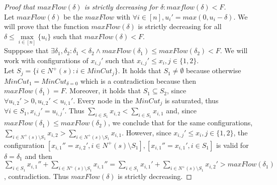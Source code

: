 \begin{proof}[Proof that $maxFlow(\delta)$ is strictly decreasing for $\delta: maxflow(\delta) < F$] \ \\
   Let $maxFlow(\delta)$ be the $maxFlow$ with $\forall i \in [n], u_i' = max(0, u_i - \delta)$.
   We will prove that the function $maxFlow(\delta)$ is strictly decreasing for all $\delta \leq \max\limits_{i \in
   [n]}\{u_i\}$ such that $maxFlow(\delta) < F$. \\
   Supppose that $\exists \delta_1, \delta_2 : \delta_1 < \delta_2 \wedge maxFlow(\delta_1) \leq maxFlow(\delta_2) < F$.
   We will work with configurations of $x_{i,j}'$ such that $x_{i,j}' \leq x_i, j \in \{1,2\}$. \\
   Let $S_j = \{i \in N^{+}(s) : i \in MinCut_j\}$. It holds that $S_1 \neq \emptyset$ because otherwise $MinCut_1 =
   MinCut_{\delta = 0}$ which is a contradiction because then $maxFlow(\delta_1) = F$. Moreover, it holds that
   $S_1 \subseteq S_2$, since $\forall u_{i,2}' > 0,u_{i,2}' < u_{i,1}'$. Every node in the $MinCut_j$ is saturated, thus
   $\forall i \in S_1, x_{i,j}' = u_{i,j}'$. Thus $\sum\limits_{i \in S_1} x_{i,2} < \sum\limits_{i \in S_1}x_{i,1}$ and,
   since $maxFlow(\delta_1) \leq maxFlow(\delta_2)$, we conclude that for the same configurations,
   $\sum\limits_{i \in N^{+}(s) \setminus S_1} x_{i,2} > \sum\limits_{i \in N^{+}(s) \setminus S_1}x_{i,1}$.
   However, since $x_{i,j}' \leq x_i, j \in \{1,2\}$, the configuration
   $[x_{i,1}'' = x_{i,2}', i \in N^{+}(s) \setminus S_1], [x_{i,1}'' = x_{i,1}', i \in S_1]$ is valid for
   $\delta = \delta_1$ and then $\sum\limits_{i \in S_1}x_{i,1}'' + \sum\limits_{i \in N^{+}(s) \setminus S_1}x_{i,1}'' =
   \sum\limits_{i \in S_1}x_{i,1}' + \sum\limits_{i \in N^{+}(s) \setminus S_1}x_{i,2}' > maxFlow(\delta_1)$,
   contradiction. Thus $maxFlow(\delta)$ is strictly decreasing.
\end{proof}
